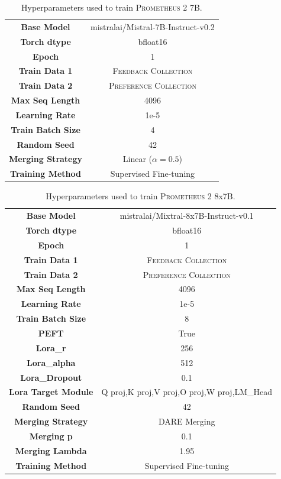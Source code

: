 \documentclass[11pt]{article}
\begin{document}
\begin{table}[t!]
\centering
\fontsize{8}{10}\selectfont
\begin{tabular}{c|c}
\toprule
\textbf{Base Model} & mistralai/Mistral-7B-Instruct-v0.2\\
\textbf{Torch dtype} &  bfloat16\\
\textbf{Epoch} & 1 \\ 
\textbf{Train Data 1} & \textsc{Feedback Collection} \\ 
\textbf{Train Data 2} & \textsc{Preference Collection} \\ 
\textbf{Max Seq Length} & 4096\\
\textbf{Learning Rate} & 1e-5\\
\textbf{Train Batch Size} & 4\\
\textbf{Random Seed} & 42\\
\textbf{Merging Strategy} & Linear ($\alpha = 0.5$)\\
\textbf{Training Method} & Supervised Fine-tuning\\
\bottomrule
\end{tabular}%
\caption{\footnotesize Hyperparameters used to train \textsc{Prometheus 2} 7B.}
\label{tab:prometheus2_7b_hyperparameter}
\end{table}


\begin{table}[t!]
\centering
\fontsize{7}{9}\selectfont
\begin{tabular}{c|c}
\toprule
\textbf{Base Model} & mistralai/Mixtral-8x7B-Instruct-v0.1\\
\textbf{Torch dtype} &  bfloat16\\
\textbf{Epoch} & 1 \\ 
\textbf{Train Data 1} & \textsc{Feedback Collection} \\ 
\textbf{Train Data 2} & \textsc{Preference Collection} \\ 
\textbf{Max Seq Length} & 4096\\
\textbf{Learning Rate} & 1e-5\\
\textbf{Train Batch Size} & 8\\
\textbf{PEFT} & True\\
\textbf{Lora\_r} & 256\\
\textbf{Lora\_alpha} & 512\\
\textbf{Lora\_Dropout} & 0.1\\
\textbf{Lora Target Module} & Q proj,K proj,V proj,O proj,W proj,LM\_Head\\
\textbf{Random Seed} & 42\\
\textbf{Merging Strategy} & DARE Merging\\
\textbf{Merging p} & 0.1\\
\textbf{Merging Lambda} & 1.95\\
\textbf{Training Method} & Supervised Fine-tuning\\
\bottomrule
\end{tabular}%
\caption{\footnotesize Hyperparameters used to train \textsc{Prometheus 2} 8x7B.}
\label{tab:prometheus2_8x7b_hyperparameter}
\end{table}
\end{document}
